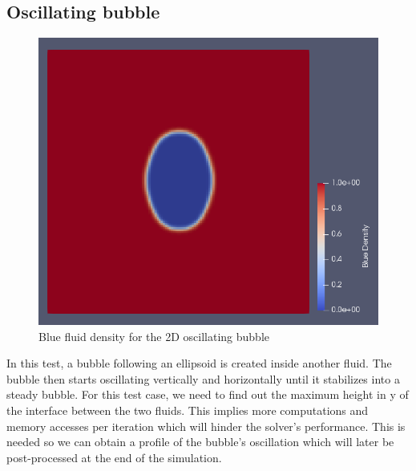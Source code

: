 \documentclass[12pt]{book}
\begin{document}
\subsection{Oscillating bubble}
\begin{figure}[H]
	\centering
	\includegraphics[width=0.9\linewidth]{Resources/Images/oscil.png}
	\caption{Blue fluid density for the 2D oscillating bubble}
	\label{fig:oscil}
\end{figure}
In this test, a bubble following an ellipsoid is created inside another fluid. The bubble then starts oscillating vertically and horizontally until it stabilizes into a steady bubble. For this test case, we need to find out the maximum height in y of the interface between the two fluids. This implies more computations and memory accesses per iteration which will hinder the solver's performance. This is needed so we can obtain a profile of the bubble's oscillation which will later be post-processed at the end of the simulation.  
\end{document}
